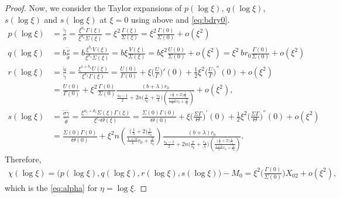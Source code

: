 \documentclass[a4paper,11pt]{article}
\def\tg{{\tilde{\gamma}}}
\def\tv{{\tilde{v}}}
\def\tth{{\tilde{\theta}}}
\def\ts{{\tilde{\sigma}}}
\def\tu{{\tilde{u}}}
\begin{document}
\begin{proof}
Now, we consider the Taylor expansions of $p(\log\xi)$, $q(\log\xi)$, $s(\log\xi)$ and $s(\log\xi)$ at $\xi=0$ using above and \eqref{eq:bdry0}.
\begin{align*}
 p(\log\xi) &= \frac{ \tg }{\ts} = \frac{ \xi^{a_1} \Gamma(\xi)}{\xi^{d_1} \Sigma(\xi)} = \xi^2\frac{\Gamma(\xi)}{\Sigma(\xi)} = \xi^2\frac{\Gamma(0)}{\Sigma(0)} + o(\xi^2) \\
 q(\log\xi) &= b\frac{\tv}{\ts} = b\frac{ \xi^{b_1} V(\xi) }{ \xi^{d_1} \Sigma(\xi)} = b\xi\frac{ V(\xi) }{ \Sigma(\xi)} = b\xi^2 \frac{U(0)}{\Sigma(0)}+ o(\xi^2)=\xi^2 ~br_0\frac{\Gamma(0)}{\Sigma(0)} + o(\xi^2) \\
 r(\log\xi) &= \frac{\tu}{ \tg } = \frac{ \xi^{1+b_1}U(\xi) }{ \xi^{a_1}\Gamma(\xi) } = \frac{ U(0) }{ \Gamma(0) }+ \xi \Big(\frac{U}{\Gamma}\Big)'(0) + \frac{1}{2}\xi^2\Big(\frac{U}{\Gamma}\Big)^{''}(0) + o(\xi^2)\\
  &=\frac{ U(0) }{ \Gamma(0) } + \xi^2\frac{\Gamma(0)}{\Sigma(0)} \frac{(b+\lambda)r_0}{\frac{s_0-1}{2}+2n\Big(\frac{2}{s_0} + \frac{r_0}{\lambda}\Big)\left(\frac{ \big(\frac{1}{\lambda}+2\big) \frac{1}{r_0} }{ \frac{1+\alpha}{\lambda}r_0 + \frac{2}{s_0}}\right)} + o(\xi^2),\\
 s(\log\xi) &= \frac{\ts\tg}{\tth} = \frac{ \xi^{a_1+d_1}\Sigma(\xi)\Gamma(\xi) }{\xi^{c_1} \Theta(\xi)} = \frac{ \Sigma(0)\Gamma(0) }{\Theta(0)} + \xi \Big(\frac{ \Sigma\Gamma }{\Theta}\Big)^{'}(0) + \frac{1}{2}\xi^2\Big(\frac{ \Sigma\Gamma }{\Theta}\Big)^{''}(0) + o(\xi^2)\\
 &=\frac{ \Sigma(0)\Gamma(0) }{\Theta(0)} + \xi^2 n \left(\frac{ \big(\frac{1}{\lambda}+2\big) \frac{1}{r_0} }{ \frac{1+\alpha}{\lambda}r_0 + \frac{2}{s_0}}\right)\frac{(b+\lambda)r_0}{\frac{s_0-1}{2}+2n\Big(\frac{2}{s_0} + \frac{r_0}{\lambda}\Big)\left(\frac{ \big(\frac{1}{\lambda}+2\big) \frac{1}{r_0} }{ \frac{1+\alpha}{\lambda}r_0 + \frac{2}{s_0}}\right)}.
\end{align*}
Therefore,
\begin{align*}
\chi(\log\xi) = \big(p(\log\xi),q(\log\xi),r(\log\xi),s(\log\xi)\big) -M_0 = \xi^2\Big(\frac{\Gamma(0)}{\Sigma(0)}\Big) X_{02} + o(\xi^2),
\end{align*}
which is the \eqref{eq:alpha} for $\eta=\log\xi$.
\end{proof}
\end{document}
